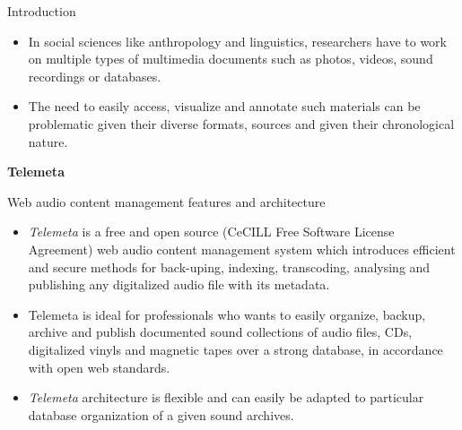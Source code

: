 \documentclass[final, hyperref, table]{beamer}
\begin{document}
\begin{frame}[containsverbatim]{}
  \begin{columns}[t]
\footnotesize
 \begin{column}[T]{.49\linewidth}
    \begin{block}{Introduction}
    
      \begin{itemize}
      \item In social sciences like anthropology and linguistics,
        researchers have to work on multiple types of multimedia
        documents such as photos, videos, sound recordings or
        databases.
      \item The need to easily access, visualize and annotate
        such materials can be problematic given their diverse formats,
        sources and given their chronological nature.
      \end{itemize}
\textbf{Telemeta}\\

    \end{block}

\begin{block}{Web audio content management features and architecture}
  \begin{itemize}
  \item \emph{Telemeta} is a free and open source ({\scriptsize CeCILL
      Free Software License Agreement}) web audio content management
    system which introduces efficient and secure methods for
    back-uping, indexing, transcoding, analysing and publishing any
    digitalized audio file with its metadata.
  \item Telemeta is ideal for
    professionals who wants to easily organize, backup, archive and
    publish documented sound collections of audio files, CDs,
    digitalized vinyls and magnetic tapes over a strong database, in
    accordance with open web standards.
  \item \emph{Telemeta} architecture
    is flexible and can easily be adapted to particular database
    organization of a given sound archives.
  \end{itemize}


\end{block}
\end{column}
\end{columns}
\end{frame}
\end{document}
